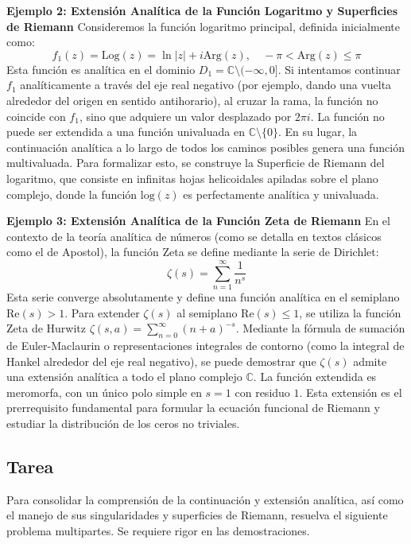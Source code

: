 \documentclass[a4paper]{article}
\begin{document}
\textbf{Ejemplo 2: Extensión Analítica de la Función Logaritmo y Superficies de Riemann}
Consideremos la función logaritmo principal, definida inicialmente como:
$$ f_1(z) = \text{Log}(z) = \ln|z| + i\text{Arg}(z), \quad -\pi < \text{Arg}(z) \leq \pi $$
Esta función es analítica en el dominio $D_1 = \mathbb{C} \setminus (-\infty, 0]$. Si intentamos continuar $f_1$ analíticamente a través del eje real negativo (por ejemplo, dando una vuelta alrededor del origen en sentido antihorario), al cruzar la rama, la función no coincide con $f_1$, sino que adquiere un valor desplazado por $2\pi i$. 
La función no puede ser extendida a una función univaluada en $\mathbb{C} \setminus \{0\}$. En su lugar, la continuación analítica a lo largo de todos los caminos posibles genera una función multivaluada. Para formalizar esto, se construye la Superficie de Riemann del logaritmo, que consiste en infinitas hojas helicoidales apiladas sobre el plano complejo, donde la función $\text{log}(z)$ es perfectamente analítica y univaluada.

\textbf{Ejemplo 3: Extensión Analítica de la Función Zeta de Riemann}
En el contexto de la teoría analítica de números (como se detalla en textos clásicos como el de Apostol), la función Zeta se define mediante la serie de Dirichlet:
$$ \zeta(s) = \sum_{n=1}^{\infty} \frac{1}{n^s} $$
Esta serie converge absolutamente y define una función analítica en el semiplano $\text{Re}(s) > 1$. Para extender $\zeta(s)$ al semiplano $\text{Re}(s) \leq 1$, se utiliza la función Zeta de Hurwitz $\zeta(s, a) = \sum_{n=0}^{\infty} (n+a)^{-s}$. 
Mediante la fórmula de sumación de Euler-Maclaurin o representaciones integrales de contorno (como la integral de Hankel alrededor del eje real negativo), se puede demostrar que $\zeta(s)$ admite una extensión analítica a todo el plano complejo $\mathbb{C}$. La función extendida es meromorfa, con un único polo simple en $s=1$ con residuo $1$. Esta extensión es el prerrequisito fundamental para formular la ecuación funcional de Riemann y estudiar la distribución de los ceros no triviales.

\subsection{Tarea}

Para consolidar la comprensión de la continuación y extensión analítica, así como el manejo de sus singularidades y superficies de Riemann, resuelva el siguiente problema multipartes. Se requiere rigor en las demostraciones.
\end{document}
